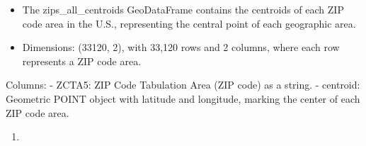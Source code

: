 \documentclass[
  letterpaper,
  DIV=11,
  numbers=noendperiod]{scrartcl}
\providecommand{\tightlist}{%
  \setlength{\itemsep}{0pt}\setlength{\parskip}{0pt}}\usepackage{longtable,booktabs,array}
\begin{document}
\begin{itemize}
\tightlist
\item
  The zips\_all\_centroids GeoDataFrame contains the centroids of each
  ZIP code area in the U.S., representing the central point of each
  geographic area.
\item
  Dimensions: (33120, 2), with 33,120 rows and 2 columns, where each row
  represents a ZIP code area.
\end{itemize}

Columns: - ZCTA5: ZIP Code Tabulation Area (ZIP code) as a string. -
centroid: Geometric POINT object with latitude and longitude, marking
the center of each ZIP code area.

\begin{enumerate}
\def\labelenumi{\arabic{enumi}.}
\setcounter{enumi}{1}
\tightlist
\item
\end{enumerate}
\end{document}
